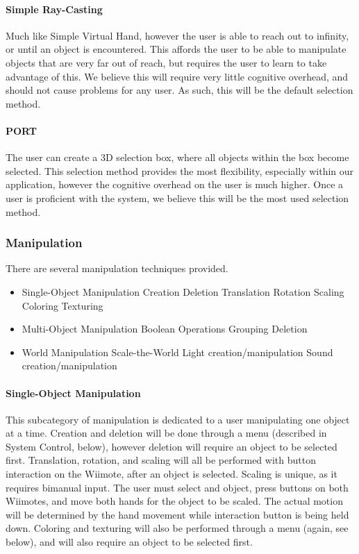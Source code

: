 \paragraph{Simple Ray-Casting}
Much like Simple Virtual Hand, however the user is able to reach out to infinity, or until an object is encountered.
This affords the user to be able to manipulate objects that are very far out of reach, but requires the user to learn to take advantage of this.
We believe this will require very little cognitive overhead, and should not cause problems for any user.
As such, this will be the default selection method.

\paragraph{PORT}
The user can create a 3D selection box, where all objects within the box become selected.
This selection method provides the most flexibility, especially within our application, however the cognitive overhead on the user is much higher.
Once a user is proficient with the system, we believe this will be the most used selection method.

\subsubsection{Manipulation}
There are several manipulation techniques provided.
\begin{itemize}
	\item Single-Object Manipulation
		\subitem Creation
		\subitem Deletion
		\subitem Translation
		\subitem Rotation
		\subitem Scaling
		\subitem Coloring
		\subitem Texturing
	\item Multi-Object Manipulation
		\subitem Boolean Operations
		\subitem Grouping
		\subitem Deletion
	\item World Manipulation
		\subitem Scale-the-World
		\subitem Light creation/manipulation
		\subitem Sound creation/manipulation
\end{itemize}

\paragraph{Single-Object Manipulation}
This subcategory of manipulation is dedicated to a user manipulating one object at a time.
Creation and deletion will be done through a menu (described in System Control, below), however deletion will require an object to be selected first.
Translation, rotation, and scaling will all be performed with button interaction on the Wiimote, after an object is selected.
Scaling is unique, as it requires bimanual input.
The user must select and object, press buttons on both Wiimotes, and move both hands for the object to be scaled.
The actual motion will be determined by the hand movement while interaction button is being held down.
Coloring and texturing will also be performed through a menu (again, see below), and will also require an object to be selected first.

